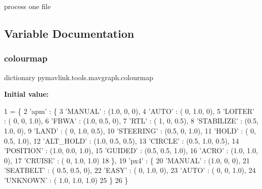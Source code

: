 \begin{DoxyVerb}process one file\end{DoxyVerb}
 

\subsection{Variable Documentation}
\mbox{\label{namespacepymavlink_1_1tools_1_1mavgraph_a327046b2526de86104baff4ee12491b6}} 
\subsubsection{\texorpdfstring{colourmap}{colourmap}}
{\footnotesize\ttfamily dictionary pymavlink.\+tools.\+mavgraph.\+colourmap}

{\bfseries Initial value\+:}
\begin{DoxyCode}
1 =  \{
2     \textcolor{stringliteral}{'apm'} : \{
3         \textcolor{stringliteral}{'MANUAL'}    : (1.0,   0,   0),
4         \textcolor{stringliteral}{'AUTO'}      : (  0, 1.0,   0),
5         \textcolor{stringliteral}{'LOITER'}    : (  0,   0, 1.0),
6         \textcolor{stringliteral}{'FBWA'}      : (1.0, 0.5,   0),
7         \textcolor{stringliteral}{'RTL'}       : (  1,   0, 0.5),
8         \textcolor{stringliteral}{'STABILIZE'} : (0.5, 1.0,   0),
9         \textcolor{stringliteral}{'LAND'}      : (  0, 1.0, 0.5),
10         \textcolor{stringliteral}{'STEERING'}  : (0.5,   0, 1.0),
11         \textcolor{stringliteral}{'HOLD'}      : (  0, 0.5, 1.0),
12         \textcolor{stringliteral}{'ALT\_HOLD'}  : (1.0, 0.5, 0.5),
13         \textcolor{stringliteral}{'CIRCLE'}    : (0.5, 1.0, 0.5),
14         \textcolor{stringliteral}{'POSITION'}  : (1.0, 0.0, 1.0),
15         \textcolor{stringliteral}{'GUIDED'}    : (0.5, 0.5, 1.0),
16         \textcolor{stringliteral}{'ACRO'}      : (1.0, 1.0,   0),
17         \textcolor{stringliteral}{'CRUISE'}    : (  0, 1.0, 1.0)
18         \},
19     \textcolor{stringliteral}{'px4'} : \{
20         \textcolor{stringliteral}{'MANUAL'}    : (1.0,   0,   0),
21         \textcolor{stringliteral}{'SEATBELT'}  : (  0.5, 0.5,   0),
22         \textcolor{stringliteral}{'EASY'}      : (  0, 1.0,   0),
23         \textcolor{stringliteral}{'AUTO'}    : (  0,   0, 1.0),
24         \textcolor{stringliteral}{'UNKNOWN'}    : (  1.0,   1.0, 1.0)
25         \}
26     \}
\end{DoxyCode}
